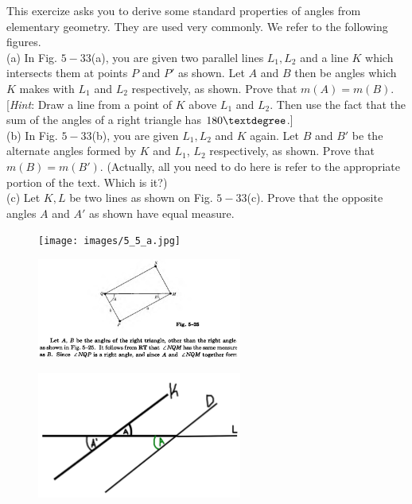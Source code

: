 \begin{tcolorbox}[title=Problem 13, breakable]
    This exercize asks you to derive some standard properties of angles from 
    elementary geometry. They are used very commonly. We refer to the following figures. \\

    (a) In Fig. $5-33$(a), you are given two parallel lines $L_1, L_2$ and a line $K$
        which intersects them at points $P$ and $P'$ as shown. Let $A$ and $B$ then 
        be angles which $K$ makes with $L_1$ and $L_2$ respectively, as shown.
        Prove that $m(A) = m(B)$. [\emph{Hint}: Draw a line from a point of $K$ above 
        $L_1$ and $L_2$. Then use the fact that the sum of the angles of a right triangle 
        has $180\textdegree$.] \\

    (b) In Fig. $5-33$(b), you are given $L_1, L_2$ and $K$ again. Let $B$ and $B'$ be 
        the alternate angles formed by $K$ and $L_1$, $L_2$ respectively, as shown.
        Prove that $m(B) = m(B')$. (Actually, all you need to do here is refer 
        to the appropriate portion of the text. Which is it?) \\

    (c) Let $K, L$ be two lines as shown on Fig. $5-33$(c). Prove that the opposite 
        angles $A$ and $A'$ as shown have equal measure.
\end{tcolorbox}

\begin{figure}[h]
    \centering
    \texttt{[image: images/5\_5\_a.jpg]}
\end{figure}

\begin{figure}[h]
    \centering
    \includegraphics[width=0.6\textwidth]{images/5_again.png}
\end{figure}

\begin{figure}[h]
    \centering
    \includegraphics[width=0.6\textwidth]{images/lets_go.png}
\end{figure}

